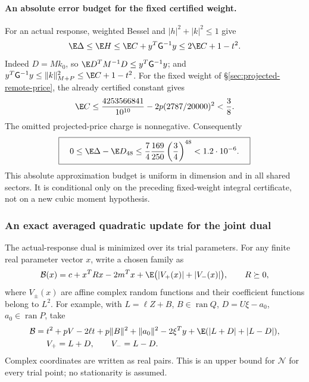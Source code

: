 \paragraph{An absolute error budget for the fixed certified weight.}
For an actual response, weighted Bessel and $|h|^2+|k|^2\le1$ give
\[
 \E\Delta\le\E H
 \le\E C+y^T\mathsf G^{-1}y
 \le2\E C+1-t^2.
\]
Indeed $D=Mk_0$, so $\E D^TM^{-1}D\le y^T\mathsf G^{-1}y$;
and $y^T\mathsf G^{-1}y\le\|k\|_{M+P}^2\le\E C+1-t^2$.
For the fixed weight of \S\ref{sec:projected-remote-price}, the
already certified constant gives
\[
 \E C\le\frac{4253566841}{10^{10}}-2p(2787/20000)^2<\frac38.
\]
The omitted projected-price charge is nonnegative. Consequently
\[
 \boxed{\quad
 0\le\E\Delta-\E D_{48}
 \le\frac74\frac{169}{250}\left(\frac34\right)^{48}
 <1.2\cdot10^{-6}.
 \quad}
\]
This absolute approximation budget is uniform in dimension and in all
shared sectors. It is conditional only on the preceding fixed-weight
integral certificate, not on a new cubic moment hypothesis.

\subsubsection{An exact averaged quadratic update for the joint dual}
The actual-response dual is minimized over its trial parameters.
For any finite real parameter vector $x$, write a chosen family as
\[
 \mathcal B(x)=c+x^TRx-2m^Tx
       +\E\bigl(|V_+(x)|+|V_-(x)|\bigr),\qquad R\succeq0,
\]
where $V_\pm(x)$ are affine complex random functions and their
coefficient functions belong to $L^2$.
For example, with $L=\ell Z+B$, $B\in\operatorname{ran}Q$,
$D=U\xi-a_0$, $a_0\in\operatorname{ran}P$, take
\[
 \begin{split}
 \mathcal B={}&t^2+pV-2\ell t+p\|B\|^2+\|a_0\|^2
                  -2\xi^Ty+\E(|L+D|+|L-D|),\\
 &V_+=L+D,\qquad V_-=L-D.
 \end{split}
\]
Complex coordinates are written as real pairs. This is an upper bound
for $\mathcal N$ for every trial point; no stationarity is assumed.

